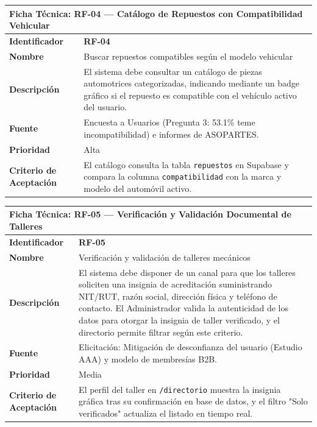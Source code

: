 \documentclass[11pt,letterpaper]{article}
\begin{document}
\newpage

\begin{table}[h!]
\centering
\small
\begin{tabularx}{\textwidth}{p{3.5cm}X}
\toprule
\multicolumn{2}{l}{\textbf{\color{darkblue}Ficha Técnica: RF-04 — Catálogo de Repuestos con Compatibilidad Vehicular}} \\
\midrule
\textbf{Identificador} & \textbf{RF-04} \\
\textbf{Nombre} & Buscar repuestos compatibles según el modelo vehicular \\
\textbf{Descripción} & El sistema debe consultar un catálogo de piezas automotrices categorizadas, indicando mediante un badge gráfico si el repuesto es compatible con el vehículo activo del usuario. \\
\textbf{Fuente} & Encuesta a Usuarios (Pregunta 3: 53.1\% teme incompatibilidad) e informes de ASOPARTES. \\
\textbf{Prioridad} & Alta \\
\textbf{Criterio de Aceptación} & El catálogo consulta la tabla \texttt{repuestos} en Supabase y compara la columna \texttt{compatibilidad} con la marca y modelo del automóvil activo. \\
\bottomrule
\end{tabularx}
\end{table}

\begin{table}[h!]
\centering
\small
\begin{tabularx}{\textwidth}{p{3.5cm}X}
\toprule
\multicolumn{2}{l}{\textbf{\color{darkblue}Ficha Técnica: RF-05 — Verificación y Validación Documental de Talleres}} \\
\midrule
\textbf{Identificador} & \textbf{RF-05} \\
\textbf{Nombre} & Verificación y validación de talleres mecánicos \\
\textbf{Descripción} & El sistema debe disponer de un canal para que los talleres soliciten una insignia de acreditación suministrando NIT/RUT, razón social, dirección física y teléfono de contacto. El Administrador valida la autenticidad de los datos para otorgar la insignia de taller verificado, y el directorio permite filtrar según este criterio. \\
\textbf{Fuente} & Elicitación: Mitigación de desconfianza del usuario (Estudio AAA) y modelo de membresías B2B. \\
\textbf{Prioridad} & Media \\
\textbf{Criterio de Aceptación} & El perfil del taller en \texttt{/directorio} muestra la insignia gráfica tras su confirmación en base de datos, y el filtro "Solo verificados" actualiza el listado en tiempo real. \\
\bottomrule
\end{tabularx}
\end{table}
\end{document}
